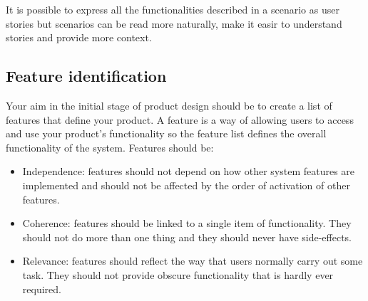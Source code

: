 \documentclass[10pt,a4paper]{report}
\begin{document}
It is possible to express all the functionalities described in a scenario as user stories but scenarios can be read more naturally, make it easir to understand stories and provide more context.

\subsection{Feature identification}
Your aim in the initial stage of product design should be to create a list of
features that define your product.
A feature is a way of allowing users to access and use your product’s functionality so the feature list defines the overall functionality of the system.
Features should be:
\begin{itemize}
	\item Independence: features should not depend on how other system features are implemented and
	should not be affected by the order of activation of other features.
	
	\item Coherence: features should be linked to a single item of functionality. They should not do more
	than one thing and they should never have side-effects.
	
	\item Relevance: features should reflect the way that users normally carry out some task. They
	should not provide obscure functionality that is hardly ever required.
\end{itemize}
\end{document}
